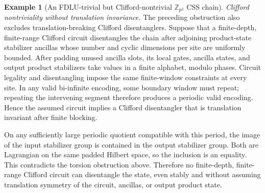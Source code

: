 \documentclass[aps,prx,english,superscriptaddress,twocolumn,tightenlines,showpacs,longbibliography,floatfix,amsfonts]{revtex4-2}
\theoremstyle{remark}
\theoremstyle{definition}
\newtheorem{example}{Example}
\begin{document}
\begin{example}[An FDLU-trivial but Clifford-nontrivial \(\mathbb Z_{p^2}\) CSS chain]
	\emph{Clifford nontriviality without translation invariance.}
	The preceding obstruction also excludes translation-breaking Clifford
	disentanglers. Suppose that a finite-depth, finite-range Clifford circuit
	disentangles the chain after adjoining product-state stabilizer ancillas
	whose number and cyclic dimensions per site are uniformly bounded. After
	padding unused ancilla slots, its local gates, ancilla states, and output
	product stabilizers take values in a finite alphabet, modulo phases.
	Circuit legality and disentangling impose the same finite-window
	constraints at every site.
	In any valid bi-infinite encoding, some boundary window must repeat;
	repeating the intervening segment therefore produces a periodic valid
	encoding. Hence the assumed circuit implies a Clifford disentangler
	that is translation invariant after finite blocking.

	On any sufficiently large periodic quotient compatible with this
	period, the image of the input stabilizer group is contained in the
	output stabilizer group. Both are Lagrangian on the same padded Hilbert
	space, so the inclusion is an equality. This contradicts the torsion
	obstruction above. Therefore no finite-depth, finite-range Clifford
	circuit can disentangle the state, even stably and without assuming
	translation symmetry of the circuit, ancillas, or output product state.


\end{example}
\end{document}
